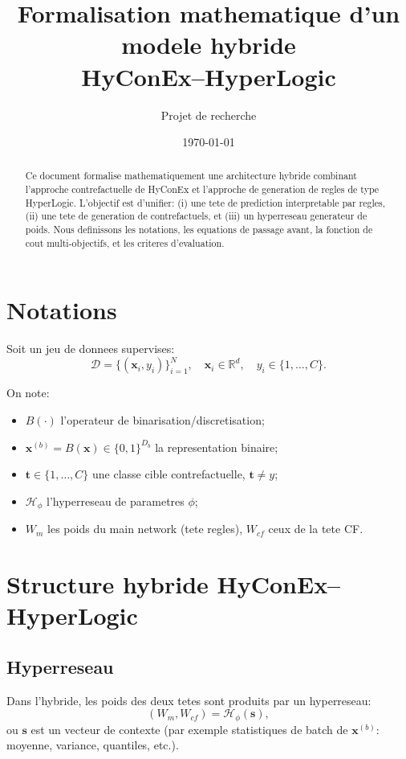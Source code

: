 \documentclass[11pt,a4paper]{article}
\title{Formalisation mathematique d'un modele hybride\\HyConEx--HyperLogic}
\author{Projet de recherche}
\date{\today}
\begin{document}
\maketitle

\begin{abstract}
Ce document formalise mathematiquement une architecture hybride combinant
l'approche contrefactuelle de HyConEx et l'approche de generation de regles de type HyperLogic.
L'objectif est d'unifier:
(i) une tete de prediction interpretable par regles,
(ii) une tete de generation de contrefactuels,
et (iii) un hyperreseau generateur de poids.
Nous definissons les notations, les equations de passage avant, la fonction de cout multi-objectifs,
et les criteres d'evaluation.
\end{abstract}

\section{Notations}
Soit un jeu de donnees supervises:
\[
\mathcal{D}=\{(\bm{x}_i,y_i)\}_{i=1}^N,\quad
\bm{x}_i\in\mathbb{R}^{d},\quad
y_i\in\{1,\dots,C\}.
\]

On note:
\begin{itemize}
    \item $B(\cdot)$ l'operateur de binarisation/discretisation;
    \item $\bm{x}^{(b)}=B(\bm{x})\in\{0,1\}^{D_b}$ la representation binaire;
    \item $\bm{t}\in\{1,\dots,C\}$ une classe cible contrefactuelle, $\bm{t}\neq y$;
    \item $\mathcal{H}_\phi$ l'hyperreseau de parametres $\phi$;
    \item $W_m$ les poids du main network (tete regles), $W_{cf}$ ceux de la tete CF.
\end{itemize}

\section{Structure hybride HyConEx--HyperLogic}
\subsection{Hyperreseau}
Dans l'hybride, les poids des deux tetes sont produits par un hyperreseau:
\[
(W_m,W_{cf})=\mathcal{H}_\phi(\bm{s}),
\]
ou $\bm{s}$ est un vecteur de contexte (par exemple statistiques de batch de $\bm{x}^{(b)}$:
moyenne, variance, quantiles, etc.).
\end{document}
